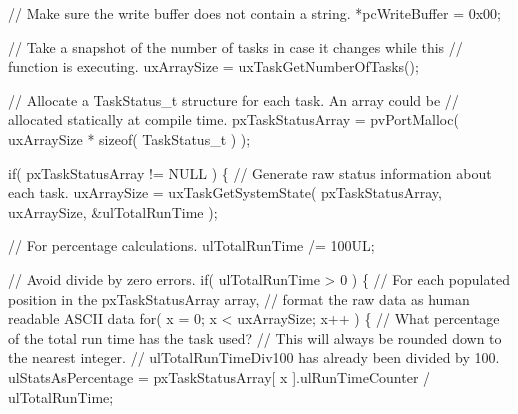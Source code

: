 \begin{DoxyPre}    // Make sure the write buffer does not contain a string.
    *pcWriteBuffer = 0x00;\end{DoxyPre}



\begin{DoxyPre}    // Take a snapshot of the number of tasks in case it changes while this
    // function is executing.
    uxArraySize = uxTaskGetNumberOfTasks();\end{DoxyPre}



\begin{DoxyPre}    // Allocate a TaskStatus\_t structure for each task.  An array could be
    // allocated statically at compile time.
    pxTaskStatusArray = pvPortMalloc( uxArraySize * sizeof( TaskStatus\_t ) );\end{DoxyPre}



\begin{DoxyPre}    if( pxTaskStatusArray != NULL )
    \{
        // Generate raw status information about each task.
        uxArraySize = uxTaskGetSystemState( pxTaskStatusArray, uxArraySize, &ulTotalRunTime );\end{DoxyPre}



\begin{DoxyPre}        // For percentage calculations.
        ulTotalRunTime /= 100UL;\end{DoxyPre}



\begin{DoxyPre}        // Avoid divide by zero errors.
        if( ulTotalRunTime > 0 )
        \{
            // For each populated position in the pxTaskStatusArray array,
            // format the raw data as human readable ASCII data
            for( x = 0; x < uxArraySize; x++ )
            \{
                // What percentage of the total run time has the task used?
                // This will always be rounded down to the nearest integer.
                // ulTotalRunTimeDiv100 has already been divided by 100.
                ulStatsAsPercentage = pxTaskStatusArray[ x ].ulRunTimeCounter / ulTotalRunTime;\end{DoxyPre}



